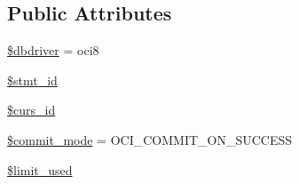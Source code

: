 \subsection*{Public Attributes}
\begin{DoxyCompactItemize}
\item 
\mbox{\hyperlink{class_c_i___d_b__oci8__driver_a0cde2a16322a023d040aa7f725877597}{\$dbdriver}} = \textquotesingle{}oci8\textquotesingle{}
\item 
\mbox{\hyperlink{class_c_i___d_b__oci8__driver_a1a97f17fd259cd27c73b65e6c3706ec0}{\$stmt\+\_\+id}}
\item 
\mbox{\hyperlink{class_c_i___d_b__oci8__driver_a75e7d18ad2e68ace3813533c9da2e179}{\$curs\+\_\+id}}
\item 
\mbox{\hyperlink{class_c_i___d_b__oci8__driver_a9b3b7163763603c5a0bcdfd819ae074d}{\$commit\+\_\+mode}} = O\+C\+I\+\_\+\+C\+O\+M\+M\+I\+T\+\_\+\+O\+N\+\_\+\+S\+U\+C\+C\+E\+SS
\item 
\mbox{\hyperlink{class_c_i___d_b__oci8__driver_a96df35d7e3e76bef21ebb80234fe59e8}{\$limit\+\_\+used}}
\end{DoxyCompactItemize}
